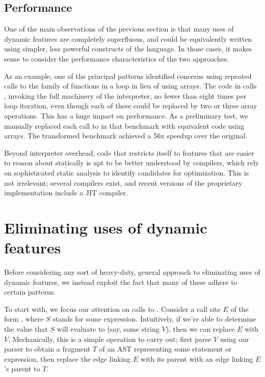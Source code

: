 \subsection{Performance}

One of the main observations of the previous section is that many uses of
dynamic features are completely superfluous, and could be equivalently written
using simpler, less powerful constructs of the language. In those cases, it
makes sense to consider the performance characteristics of the two approaches.

As an example, one of the principal patterns identified concerns using repeated
calls to the  family of functions in a loop in lieu of using arrays.
The code in  calls , invoking the full
machinery of the interpreter, no fewer than eight times per loop iteration,
even though each of these could be replaced by two or three array operations.
This has a huge impact on performance. As a preliminary test, we manually
replaced each call to  in that benchmark with equivalent code using
arrays. The transformed benchmark achieved a 56x speedup over the original.

Beyond interpreter overhead, code that restricts itself to features that are
easier to reason about statically is apt to be better understood by compilers,
which rely on sophisticated static analysis to identify candidates for
optimization. This is not irrelevant; several \matlab compilers exist, and
recent versions of the proprietary \matlab implementation include a JIT
compiler. %

\section{Eliminating uses of dynamic features}

Before considering any sort of heavy-duty, general approach to eliminating
uses of dynamic features, we instead exploit the fact that many of these
adhere to certain patterns.

To start with, we focus our attention on calls to . Consider a call
site $E$ of the form , where $S$ stands for some \matlab
expression. Intuitively, if we're able to determine the value that $S$ will
evaluate to (say, some string $V$), then we can replace $E$ with $V$.
Mechanically, this is a simple operation to carry out; first parse $V$ using
our \matlab parser to obtain a fragment $T$ of an AST representing some
statement or expression, then replace the edge linking $E$ with its parent with
an edge linking $E$'s parent to $T$.


